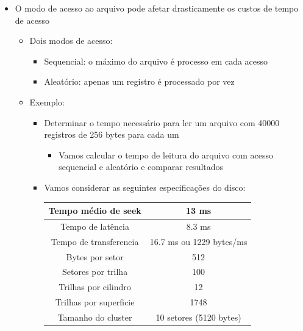 \documentclass[12pt]{article}
\begin{document}
\begin{itemize}
\begin{itemize}
        \end{itemize}
        \item O modo de acesso  ao arquivo pode afetar drasticamente os 
        custos de tempo de acesso
        \begin{itemize}
            \item Dois modos de acesso:
            \begin{itemize}
                \item Sequencial: o máximo do arquivo é processo em cada 
                acesso
                \item Aleatório: apenas um registro é processado por vez
            \end{itemize}
            \item Exemplo:
            \begin{itemize}
                \item Determinar o tempo necessário para ler um arquivo com 
                40000 registros de 256 bytes para cada um
                \begin{itemize}
                    \item Vamos calcular o tempo de leitura do arquivo com 
                    acesso sequencial e aleatório e comparar resultados
                \end{itemize}
                \item Vamos considerar as seguintes especificações do disco:
                \begin{table}[H]
                    \centering
                    \begin{tabular}{|c|c|}
                        \hline
                        Tempo médio de seek & 13 ms \\ \hline
                        Tempo de latência & 8.3 ms \\ \hline
                        Tempo de transferencia & 16.7 ms ou 1229 bytes/ms \\
                        \hline
                        Bytes por setor & 512 \\ \hline
                        Setores por trilha & 100 \\ \hline
                        Trilhas por cilindro & 12 \\ \hline
                        Trilhas por superficie & 1748 \\ \hline
                        Tamanho do cluster & 10 setores (5120 bytes) \\ \hline
                    \end{tabular}

\end{table}
\end{itemize}
\end{itemize}
\end{itemize}
\end{document}
